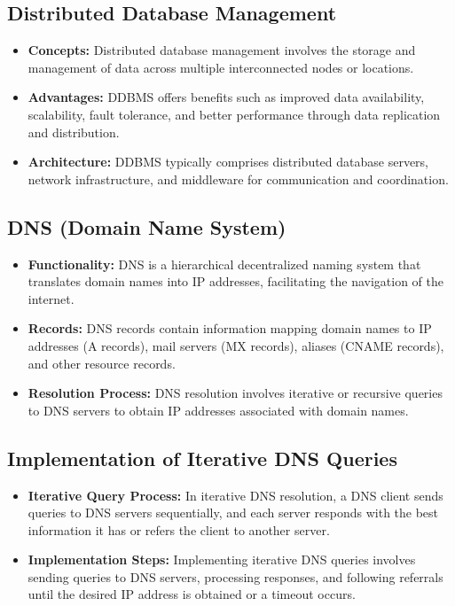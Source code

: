 \documentclass[11pt]{article}
\begin{document}
\subsection{Distributed Database Management}

\begin{itemize}
\item \textbf{Concepts:} Distributed database management involves the storage and management of data across multiple interconnected nodes or locations.
\item \textbf{Advantages:} DDBMS offers benefits such as improved data availability, scalability, fault tolerance, and better performance through data replication and distribution.
\item \textbf{Architecture:} DDBMS typically comprises distributed database servers, network infrastructure, and middleware for communication and coordination.
\end{itemize}

\subsection{DNS (Domain Name System)}

\begin{itemize}
\item \textbf{Functionality:} DNS is a hierarchical decentralized naming system that translates domain names into IP addresses, facilitating the navigation of the internet.
\item \textbf{Records:} DNS records contain information mapping domain names to IP addresses (A records), mail servers (MX records), aliases (CNAME records), and other resource records.
\item \textbf{Resolution Process:} DNS resolution involves iterative or recursive queries to DNS servers to obtain IP addresses associated with domain names.
\end{itemize}

\subsection{Implementation of Iterative DNS Queries}

\begin{itemize}
\item \textbf{Iterative Query Process:} In iterative DNS resolution, a DNS client sends queries to DNS servers sequentially, and each server responds with the best information it has or refers the client to another server.
\item \textbf{Implementation Steps:} Implementing iterative DNS queries involves sending queries to DNS servers, processing responses, and following referrals until the desired IP address is obtained or a timeout occurs.
\end{itemize}
\end{document}
